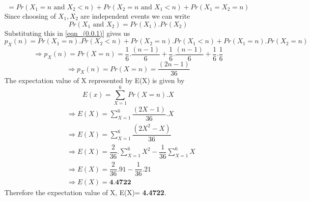 \documentclass[journal,12pt,twocolumn]{IEEEtran}
\begin{document}
\begin{equation} \label{eqn_(0.0.1)}
    = Pr(X_1=n\text{ and }X_2<n)+Pr(X_2=n\text{ and }X_1<n)+Pr(X_1=X_2=n)
\end{equation}
 Since choosing of $X_1,X_2$ are independent events we can write 
 $$Pr(X_1 \text{ and }X_2)=Pr(X_1).Pr(X_2)$$
 Substituting this in \eqref{eqn_(0.0.1)} gives us
 $$p_X(n)=Pr(X_1=n).Pr(X_2<n)+Pr(X_2=n).Pr(X_1<n)+Pr(X_1=n).Pr(X_2=n)$$
$$\Longrightarrow p_X(n)=Pr(X=n)=\dfrac{1}{6}.\dfrac{(n-1)}{6}+\dfrac{1}{6}.\dfrac{(n-1)}{6}+\dfrac{1}{6}.\dfrac{1}{6}$$
$$\Longrightarrow p_X(n)=Pr(X=n)=\dfrac{(2n-1)}{36}$$
The expectation value of X represented by E(X) is given by
$$E(x)=\sum_{X=1}^{6} Pr(X=n).X$$
\begin{align}
& \Longrightarrow E(X)=\sum_{X=1}^{6} \dfrac{(2X-1)}{36}.X\\
& \Longrightarrow E(X)=\sum_{X=1}^{6} \dfrac{(2X^2-X)}{36}\\
& \Longrightarrow E(X)=\dfrac{2}{36}.\sum_{X=1}^{6} X^2-\dfrac{1}{36}\sum_{X=1}^{6} X\\
& \Longrightarrow E(X)=\dfrac{2}{36}.91-\dfrac{1}{36}.21\\
& \Longrightarrow E(X)= \textbf{4.4722}
\end{align}
Therefore the expectation value of X, E(X)= \textbf{4.4722}.
\end{document}
